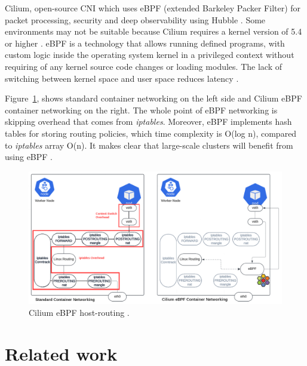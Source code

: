 Cilium, open-source CNI which uses eBPF (extended Barkeley Packer Filter) for packet processing, security and deep observability using Hubble \cite{CiliumDocs}. Some environments may not be suitable because Cilium requires a kernel version of 5.4 or higher \cite{CiliumDocs}. eBPF is a technology that allows running defined programs, with custom logic inside the operating system kernel in a privileged context without requiring of any kernel source code changes or loading modules. The lack of switching between kernel space and user space reduces latency \cite{eBPF}. 

Figure~\ref{fig:ebpf_routing}, shows standard container networking on the left side and Cilium eBPF container networking on the right. The whole point of eBPF networking is skipping overhead that comes from \textit{iptables}. Moreover, eBPF implements hash tables for storing routing policies, which time complexity is O(log n), compared to \textit{iptables} array O(n). It makes clear that large-scale clusters will benefit from using eBPF \cite{IsovalentHash}. 

\begin{figure}[H]
    \centering
    \includegraphics[width=0.9\columnwidth]{images/ebpf_hostrouting.png}
    \caption{Cilium eBPF host-routing \cite{CiliumCNIBenchmark}.}
    \label{fig:ebpf_routing}
\end{figure}




\section{Related work}
\label{sec:realted_work}

